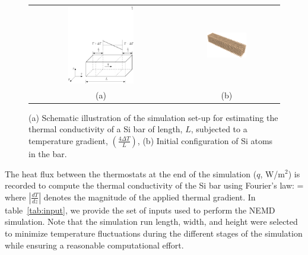 \begin{figure}[htbp]
\begin{center}
\begin{tabular}{cc}
  \includegraphics[width=0.48\textwidth]{./Figures/schematic}
  &
  \hspace{3mm}
  \includegraphics[width=0.40\textwidth]{./Figures/Sibar_05}
  \\ (a) & (b)
  \end{tabular}
\caption{(a) Schematic illustration of the simulation set-up for estimating the thermal conductivity of a Si bar of
length, $L$, subjected to a temperature gradient, $\left(\frac{4\Delta T}{L}\right)$, (b) 
Initial configuration of Si atoms in the bar.}
\label{fig:setup}
\end{center}
\end{figure}
%
The heat flux between the thermostats at the end of the simulation ($q$, W/m$^2$) is recorded to compute the
thermal conductivity of the Si bar using Fourier's law:
%
\be
 \kappa =  
\ee
%
where $\left|\frac{dT}{dz}\right|$ denotes the magnitude of the applied thermal gradient. In table~\ref{tab:input},
we provide the set of inputs used to perform the NEMD simulation. Note that the simulation run length, width, 
and height were selected to minimize temperature fluctuations during the different stages of the simulation while
ensuring a reasonable computational effort. 
%
